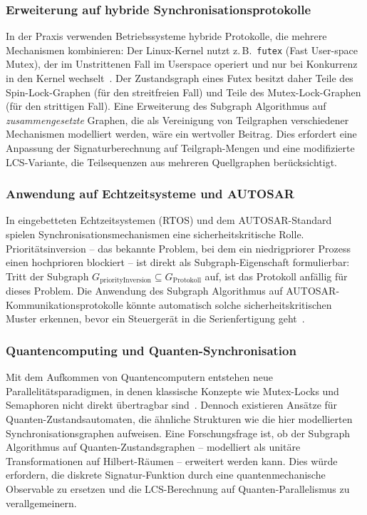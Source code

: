﻿\documentclass[a4paper,12pt]{article}
\theoremstyle{definition}
\begin{document}
\subsubsection{Erweiterung auf hybride Synchronisationsprotokolle}

In der Praxis verwenden Betriebssysteme hybride Protokolle, die mehrere
Mechanismen kombinieren: Der Linux-Kernel nutzt z.\,B.\ \texttt{futex}
(Fast User-space Mutex), der im Unstrittenen Fall im Userspace operiert
und nur bei Konkurrenz in den Kernel wechselt~\cite{franke2002fuss}.
Der Zustandsgraph eines Futex besitzt daher Teile des Spin-Lock-Graphen
(für den streitfreien Fall) und Teile des Mutex-Lock-Graphen (für den
strittigen Fall). Eine Erweiterung des Subgraph Algorithmus auf
\emph{zusammengesetzte} Graphen, die als Vereinigung von Teilgraphen
verschiedener Mechanismen modelliert werden, wäre ein wertvoller Beitrag.
Dies erfordert eine Anpassung der Signaturberechnung auf Teilgraph-Mengen
und eine modifizierte LCS-Variante, die Teilsequenzen aus mehreren
Quellgraphen berücksichtigt.

\subsubsection{Anwendung auf Echtzeitsysteme und AUTOSAR}

In eingebetteten Echtzeitsystemen (RTOS) und dem AUTOSAR-Standard~\cite{autosar2021}
spielen Synchronisationsmechanismen eine sicherheitskritische Rolle.
Prioritätsinversion -- das bekannte Problem, bei dem ein niedrigpriorer
Prozess einen hochprioren blockiert -- ist direkt als Subgraph-Eigenschaft
formulierbar: Tritt der Subgraph $G_{\mathrm{priorityInversion}} \subseteq
G_{\mathrm{Protokoll}}$ auf, ist das Protokoll anfällig für dieses Problem.
Die Anwendung des Subgraph Algorithmus auf AUTOSAR-Kommunikations\-protokolle
könnte automatisch solche sicherheitskritischen Muster erkennen, bevor ein
Steuergerät in die Serienfertigung geht~\cite{iso26262}.

\subsubsection{Quantencomputing und Quanten-Synchronisation}

Mit dem Aufkommen von Quantencomputern entstehen neue Parallelitätsparadigmen,
in denen klassische Konzepte wie Mutex-Locks und Semaphoren nicht direkt
übertragbar sind~\cite{gay2006quantum}. Dennoch existieren Ansätze für
Quanten-Zustandsautomaten, die ähnliche Strukturen wie die hier modellierten
Synchronisationsgraphen aufweisen. Eine Forschungsfrage ist, ob der Subgraph
Algorithmus auf Quanten-Zustandsgraphen -- modelliert als unitäre
Transformationen auf Hilbert-Räumen -- erweitert werden kann. Dies würde
erfordern, die diskrete Signatur-Funktion durch eine quantenmechanische
Observable zu ersetzen und die LCS-Berechnung auf Quanten-Parallelismus
zu verallgemeinern.
\end{document}
